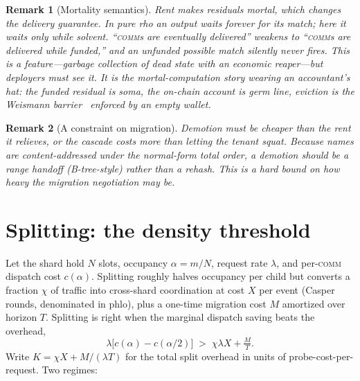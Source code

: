\documentclass[11pt]{article}
\newtheorem{remark}{Remark}
\begin{document}
\begin{remark}[Mortality semantics]
Rent makes residuals \emph{mortal}, which changes the delivery guarantee. In pure rho an output waits forever for its match; here it waits only while solvent. ``\textsc{comm}s are eventually delivered'' weakens to ``\textsc{comm}s are delivered while funded,'' and an unfunded possible match silently never fires. This is a feature---garbage collection of dead state with an economic reaper---but deployers must see it. It is the mortal-computation story wearing an accountant's hat: the funded residual is soma, the on-chain account is germ line, eviction is the Weismann barrier~\cite{weismann1893} enforced by an empty wallet.
\end{remark}

\begin{remark}[A constraint on migration]
Demotion must be \emph{cheaper than the rent it relieves}, or the cascade costs more than letting the tenant squat. Because names are content-addressed under the normal-form total order, a demotion should be a range handoff (B-tree-style) rather than a rehash. This is a hard bound on how heavy the migration negotiation may be.
\end{remark}

\section{Splitting: the density threshold}
\label{sec:split}

Let the shard hold $N$ slots, occupancy $\alpha=m/N$, request rate $\lambda$, and per-\textsc{comm} dispatch cost $c(\alpha)$. Splitting roughly halves occupancy per child but converts a fraction $\chi$ of traffic into cross-shard coordination at cost $X$ per event (Casper rounds, denominated in phlo), plus a one-time migration cost $M$ amortized over horizon $T$. Splitting is right when the marginal dispatch saving beats the overhead,
\[
\lambda\bigl[c(\alpha)-c(\alpha/2)\bigr] \;>\; \chi\lambda X + \tfrac{M}{T}.
\]
Write $K=\chi X + M/(\lambda T)$ for the total split overhead in units of probe-cost-per-request. Two regimes:
\end{document}
